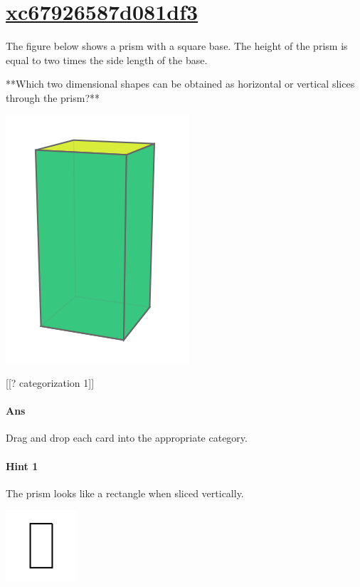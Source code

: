 \documentclass[twocolumn,10pt]{article}
\def\shrinkfactor{0.4}
\begin{document}
\section{\href{https://www.khanacademy.org/devadmin/content/items/xc67926587d081df3}{xc67926587d081df3}}

\noindent
The figure below shows a prism with a square base. The height of the prism is equal to two times the side length of the base. 

**Which two dimensional shapes can be obtained as  horizontal or vertical slices through the prism?**  


\includegraphics[scale=\shrinkfactor]{figures/eda1fc1966ba0b21e91b1ad9a6112ab7e8dc762b.png}

[[? categorization 1]]

\paragraph{Ans} Drag and drop each card into the appropriate category. 

\paragraph{Hint 1}The prism looks like a rectangle when sliced vertically.  

\includegraphics[scale=\shrinkfactor]{figures/225bc3d058cebe2059fc56f78ef80b5f3e0f2da7.png}
\end{document}
